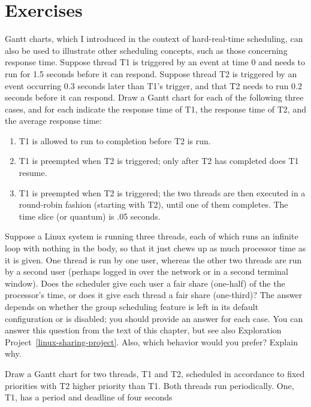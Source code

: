\section*{Exercises}
\begin{chapterEnumerate}
\item
Gantt charts, which I introduced in the context of hard-real-time
scheduling, can also be used to illustrate other scheduling concepts,
such as those concerning response time.  Suppose thread T1 is
triggered by an event at time 0 and needs to run for 1.5 seconds
before it can respond.  Suppose thread T2 is triggered by an event
occurring 0.3 seconds later than T1's trigger, and that T2 needs to run
0.2 seconds before it can respond.  Draw a Gantt chart for each of the
following three cases, and for each indicate the response time of T1,
the response time of T2, and the average response time:
\begin{enumerate}
\item
T1 is allowed to run to completion before T2 is run.
\item
T1 is preempted when T2 is triggered; only after T2 has completed does
T1 resume.
\item
T1 is preempted when T2 is triggered; the two threads are then
executed in a round-robin fashion (starting with T2), until one
of them completes.  The time slice (or quantum) is .05 seconds.
\end{enumerate}
\item\label{linux-sharing-exercise}
Suppose a Linux system is running three threads, each of which runs an
infinite loop with nothing in the body, so that it just chews up as
much processor time as it is given.  One thread is run by one user,
whereas the other two threads are run by a second user (perhaps logged
in over the network or in a second terminal window).  Does the
scheduler give each user a fair share (one-half) of the the
processor's time, or does it give each thread a fair share (one-third)?
The answer depends on whether the group scheduling feature is
left in its default configuration or is disabled; you should
provide an answer for each case.
You can answer this question from the text of this chapter, but see
also Exploration Project~\ref{linux-sharing-project}.
Also, which behavior would you prefer?  Explain why.
\item\label{Gantt-backward-RMS-exercise}
Draw a Gantt chart for two threads, T1 and T2, scheduled in accordance
to fixed priorities with T2 higher priority than T1.  Both threads run
periodically.  One, T1, has a period and deadline of four seconds

\end{chapterEnumerate}
